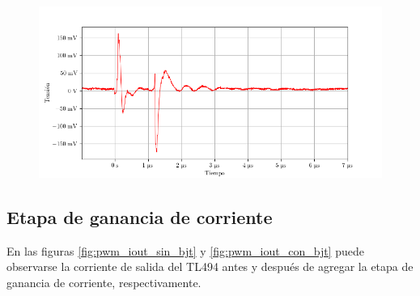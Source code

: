 
\begin{figure}[H]
    \centering
    \includegraphics[width=\textwidth]{images/capturas-osciloscopio/TL494/DTC_v.png}
    \caption{} %
    \label{fig:dtc_v}
\end{figure}






\subsection{Etapa de ganancia de corriente}

En las figuras \ref{fig:pwm_iout_sin_bjt} y \ref{fig:pwm_iout_con_bjt} puede observarse la corriente de salida del TL494 antes y después de agregar la etapa de ganancia de corriente, respectivamente.

